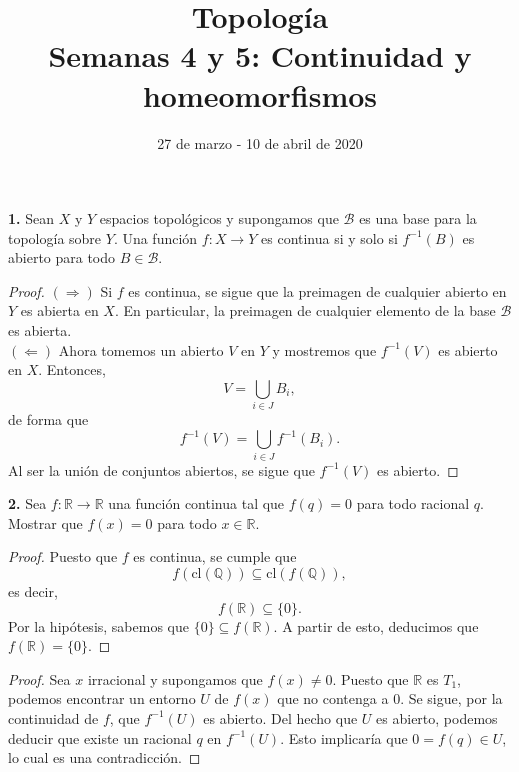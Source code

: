 \documentclass{article}
\begin{document}
\date{27 de marzo - 10 de abril de 2020}
\title{ \textbf{Topología} \\
Semanas 4 y 5: Continuidad y homeomorfismos}
\maketitle	

\begin{mybox}
	\textbf{1. } Sean $X$ y $Y$ espacios topológicos y supongamos que $\mathcal{B}$ es una base para la topología sobre $Y$. Una función $f: X \rightarrow Y$ es continua si y solo si $f^{-1}(B)$ es abierto para todo $B \in \mathcal{B}$.
\end{mybox}	
\begin{proof}
	$(\Rightarrow)$ Si $f$ es continua, se sigue que la preimagen de cualquier abierto en $Y$ es abierta en $X$. En particular, la preimagen de cualquier elemento de la base $\mathcal{B}$ es abierta.\\
	$(\Leftarrow)$ Ahora tomemos un abierto $V$ en $Y$ y mostremos que $f^{-1}(V)$ es abierto en $X$. Entonces,
	$$ V = \bigcup_{i \in J} B_{i} ,$$
	de forma que 
	$$ f^{-1}(V) = \bigcup_{i \in J} f^{-1}(B_{i}) .$$
	Al ser la unión de conjuntos abiertos, se sigue que $f^{-1}(V)$ es abierto. 
\end{proof}

\begin{mybox}
	\textbf{2. } Sea $f: \mathbb{R} \rightarrow \mathbb{R}$ una función continua tal que $f(q) = 0$ para todo racional $q$. Mostrar que $f(x) = 0$ para todo $x \in \mathbb{R}$.  	
\end{mybox}	

\begin{proof}
	Puesto que $f$ es continua, se cumple que 
	$$ f(\text{cl}(\mathbb{Q})) \subseteq \text{cl}(f(\mathbb{Q})), $$
	es decir,
	$$ f(\mathbb{R}) \subseteq \{ 0 \}. $$
	Por la hipótesis, sabemos que $\{0 \} \subseteq f(\mathbb{R})$. A partir de esto, deducimos que $f(\mathbb{R}) = \{ 0 \}$.
\end{proof}

\begin{proof}
	Sea $x$ irracional y supongamos que $f(x) \neq 0$. Puesto que $\mathbb{R}$ es $T_{1}$, podemos encontrar un entorno $U$ de $f(x)$ que no contenga a $0$. Se sigue, por la continuidad de $f$, que $f^{-1}(U)$ es abierto. Del hecho que $U$ es abierto, podemos deducir que existe un racional $q$ en $f^{-1}(U)$. Esto implicaría que $0 = f(q) \in U$, lo cual es una contradicción. 
\end{proof}
\end{document}

